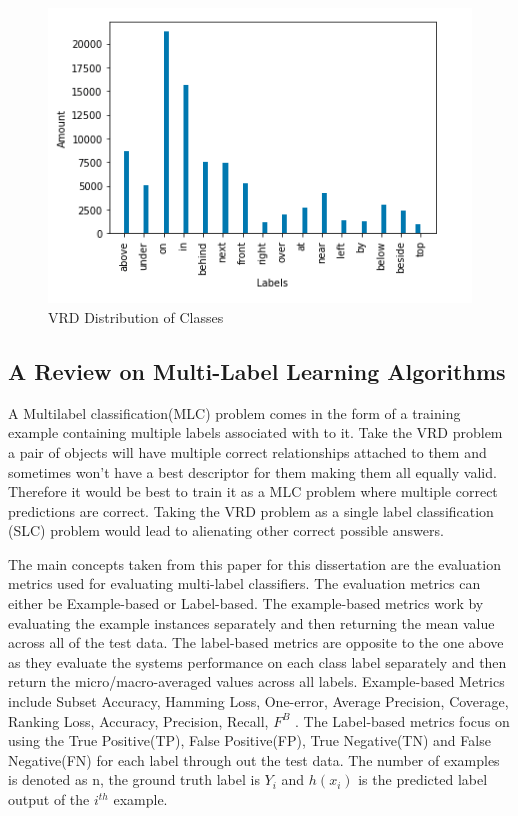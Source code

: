 \documentclass{csfyp}
\begin{document}
\begin{figure}[!htbp]
	\includegraphics[scale=0.60,center]{VRD_Labels.pdf}
	\caption{VRD Distribution of Classes}
\end{figure}

\subsection{A Review on Multi-Label Learning Algorithms}
A Multilabel classification(MLC) problem comes in the form of a training example containing multiple labels associated with to it. Take the VRD problem a pair of objects will have multiple correct relationships attached to them and sometimes won't have a best descriptor for them making them all equally valid. Therefore it would be best to train it as a MLC problem where multiple correct predictions are correct. Taking the VRD problem as a single label classification (SLC) problem would lead to alienating other correct possible answers. 

The main concepts taken from this paper for this dissertation are the evaluation metrics used for evaluating multi-label classifiers. The evaluation metrics can either be Example-based or Label-based. The example-based metrics work by evaluating the example instances separately and then returning the mean value across all of the test data. The label-based metrics are opposite to the one above as they evaluate the systems performance on each class label separately and then return the micro/macro-averaged values across all labels. Example-based Metrics include Subset Accuracy, Hamming Loss, One-error, Average Precision, Coverage, Ranking Loss, Accuracy, Precision, Recall, $F^B$ . The Label-based metrics focus on using the True Positive(TP), False Positive(FP), True Negative(TN) and False Negative(FN) for each label through out the test data. The number of examples is denoted as n, the ground truth label is $Y_{i}$ and $h(x_{i})$ is the predicted label output of the $i^{th}$ example.
\end{document}
